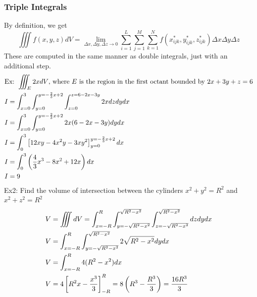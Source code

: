\documentclass[11pt, fleqn]{article}
\begin{document}
\subsubsection{Triple Integrals}
By definition, we get
$$\iiint f(x,y,z)dV=\lim_{\Delta x,\Delta y,\Delta z\to0}\sum_{i=1}^L\sum_{j=1}^M\sum_{k=1}^Nf(x_{ijk}^*,y_{ijk}^*,z_{ijk}^*)\Delta x\Delta y\Delta z$$
These are computed in the same manner as double integrals, just with an additional step.\\
\begin{align*}
    &\text{Ex: }\iiint_E 2xdV\text{, where $E$ is the region in the first octant bounded by }2x+3y+z=6\\
    &I=\int_{x=0}^3\int_{y=0}^{y=-\frac{2}{3}x+2}\int_{z=0}^{z=6-2x-3y}2xdzdydx\\
    &I=\int_{x=0}^3\int_{y=0}^{y=-\frac{2}{3}x+2}2x(6-2x-3y)dydx\\
    &I=\int_0^3\left[ 12xy-4x^2y-3xy^2 \right]_{y=0}^{y=-\frac{2}{3}x+2}dx\\
    &I=\int_0^3\left( \frac{4}{3}x^3-8x^2+12x \right)dx\\
    &I=9
\end{align*}
Ex2: Find the volume of intersection between the cylinders $x^2+y^2=R^2$ and $x^2+z^2=R^2$
\begin{align*}
    &V=\iiint dV=\int_{x=-R}^R\int_{y=-\sqrt{R^2-x^2}}^{\sqrt{R^2-x^2}}\int_{z=-\sqrt{R^2-x^2}}^{\sqrt{R^2-x^2}}dzdydx\\
    &V=\int_{x=-R}^R\int_{y=-\sqrt{R^2-x^2}}^{\sqrt{R^2-x^2}}2\sqrt{R^2-x^2}dydx\\
    &V=\int_{x=-R}^R4(R^2-x^2)dx\\
    &V=4\left[ R^2x-\frac{x^3}{3} \right]_{-R}^R=8\left( R^3-\frac{R^3}{3} \right)=\frac{16R^3}{3}
\end{align*}
\end{document}
